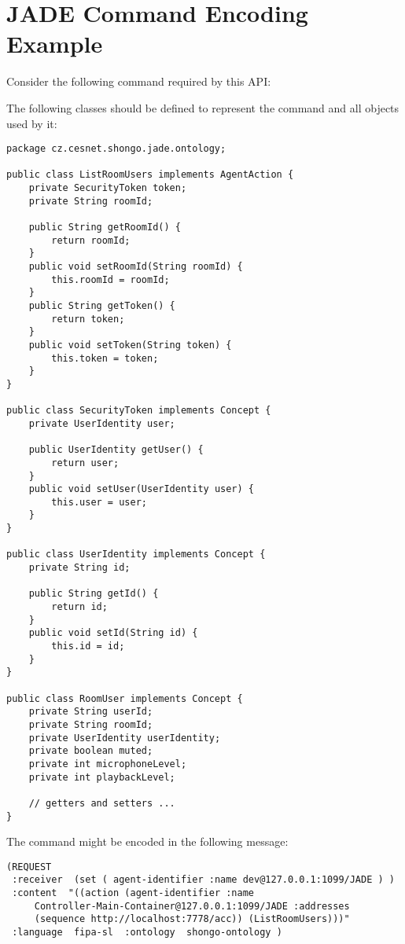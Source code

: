 \chapter{JADE Command Encoding Example} \label{appendix:jade-command-encoding}

Consider the following command required by this API:
\begin{Api}
\end{Api}

The following classes should be defined to represent the command and all objects used by it:
\begin{verbatim}
package cz.cesnet.shongo.jade.ontology;

public class ListRoomUsers implements AgentAction {
    private SecurityToken token;
    private String roomId;

    public String getRoomId() {
        return roomId;
    }
    public void setRoomId(String roomId) {
        this.roomId = roomId;
    }
    public String getToken() {
        return token;
    }
    public void setToken(String token) {
        this.token = token;
    }
}

public class SecurityToken implements Concept {
    private UserIdentity user;

    public UserIdentity getUser() {
        return user;
    }
    public void setUser(UserIdentity user) {
        this.user = user;
    }
}

public class UserIdentity implements Concept {
    private String id;

    public String getId() {
        return id;
    }
    public void setId(String id) {
        this.id = id;
    }
}

public class RoomUser implements Concept {
    private String userId;
    private String roomId;
    private UserIdentity userIdentity;
    private boolean muted;
    private int microphoneLevel;
    private int playbackLevel;

    // getters and setters ...
}
\end{verbatim}

The command might be encoded in the following message:
\begin{verbatim}
(REQUEST
 :receiver  (set ( agent-identifier :name dev@127.0.0.1:1099/JADE ) )
 :content  "((action (agent-identifier :name
     Controller-Main-Container@127.0.0.1:1099/JADE :addresses
     (sequence http://localhost:7778/acc)) (ListRoomUsers)))"
 :language  fipa-sl  :ontology  shongo-ontology )
\end{verbatim}

